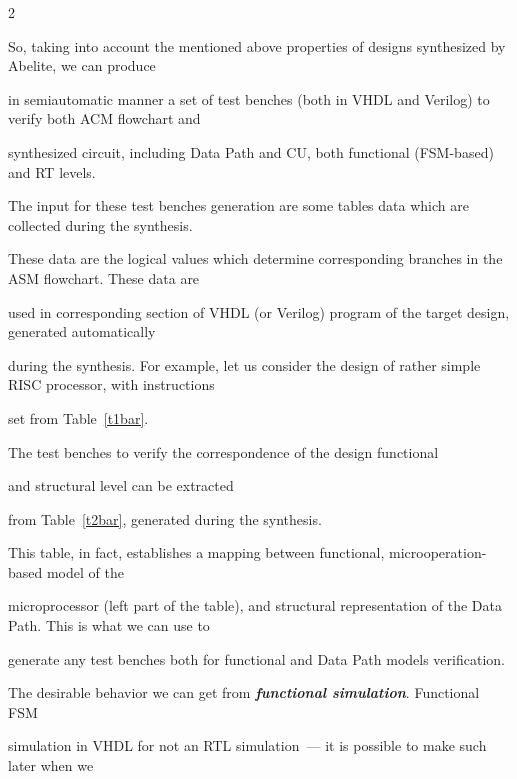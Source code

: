 \begin{multicols}{2}





So, taking into account the mentioned above properties of designs synthesized by Abelite, we can produce


in semiautomatic manner a set of test benches (both in VHDL and Verilog) to verify both ACM flowchart and


synthesized circuit, including Data Path and CU, both functional (FSM-based) and RT levels.





   The input for these test benches generation are some tables data which are collected during the synthesis.


These data are the logical values which determine corresponding branches in the ASM flowchart. These data are


used in corresponding section of VHDL (or Verilog) program of the target design, generated automatically


during the synthesis. For example, let us consider the design of rather simple RISC processor, with instructions


set from Table~\ref{t1bar}.











   The test benches to verify the correspondence of the design functional


and structural level can be extracted


from Table~\ref{t2bar}, generated during the synthesis.


This table, in fact, establishes a mapping between functional, microoperation-based model of the


microprocessor (left part of the table), and structural representation of the Data Path. This is what we can use to


generate any test benches both for functional and Data Path models verification.








The desirable behavior we can get from {\bfseries\textit{functional simulation}}. Functional FSM


simulation in VHDL for not an RTL simulation~--- it is possible to make such later when we



\end{multicols}
